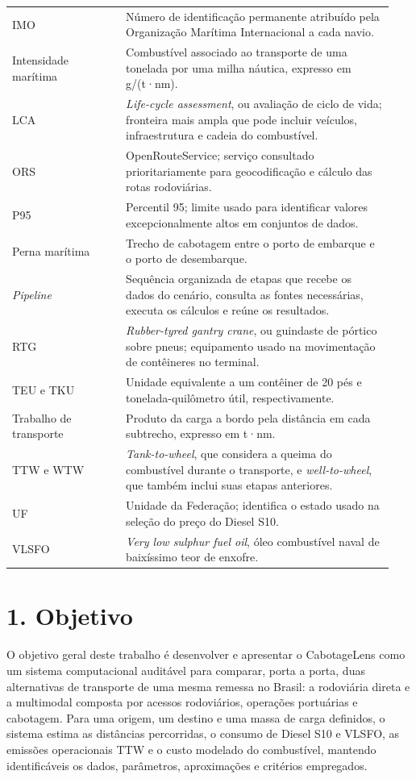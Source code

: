 \documentclass[brazil,]{article}
\let\oldsection\section
\renewcommand{\section}{\Needspace{14\baselineskip}\oldsection}
\begin{document}
\begin{longtable}{@{}p{0.28\linewidth}p{0.66\linewidth}@{}}
IMO & Número de identificação permanente atribuído pela Organização Marítima Internacional a cada navio. \\
Intensidade marítima & Combustível associado ao transporte de uma tonelada por uma milha náutica, expresso em g/(t·nm). \\
LCA & \textit{Life-cycle assessment}, ou avaliação de ciclo de vida; fronteira mais ampla que pode incluir veículos, infraestrutura e cadeia do combustível. \\
ORS & OpenRouteService; serviço consultado prioritariamente para geocodificação e cálculo das rotas rodoviárias. \\
P95 & Percentil 95; limite usado para identificar valores excepcionalmente altos em conjuntos de dados. \\
Perna marítima & Trecho de cabotagem entre o porto de embarque e o porto de desembarque. \\
\textit{Pipeline} & Sequência organizada de etapas que recebe os dados do cenário, consulta as fontes necessárias, executa os cálculos e reúne os resultados. \\
RTG & \textit{Rubber-tyred gantry crane}, ou guindaste de pórtico sobre pneus; equipamento usado na movimentação de contêineres no terminal. \\
TEU e TKU & Unidade equivalente a um contêiner de 20 pés e tonelada-quilômetro útil, respectivamente. \\
Trabalho de transporte & Produto da carga a bordo pela distância em cada subtrecho, expresso em t·nm. \\
TTW e WTW & \textit{Tank-to-wheel}, que considera a queima do combustível durante o transporte, e \textit{well-to-wheel}, que também inclui suas etapas anteriores. \\
UF & Unidade da Federação; identifica o estado usado na seleção do preço do Diesel S10. \\
VLSFO & \textit{Very low sulphur fuel oil}, óleo combustível naval de baixíssimo teor de enxofre. \\
\bottomrule
\end{longtable}

\clearpage

\hypertarget{objetivo}{%
\section{1. Objetivo}\label{objetivo}}

O objetivo geral deste trabalho é desenvolver e apresentar o
CabotageLens como um sistema computacional auditável para comparar, porta
a porta, duas alternativas de transporte de uma mesma remessa no Brasil:
a rodoviária direta e a multimodal composta por acessos rodoviários,
operações portuárias e cabotagem. Para uma origem, um destino e uma massa
de carga definidos, o sistema estima as distâncias percorridas, o consumo
de Diesel S10 e VLSFO, as emissões operacionais TTW e o custo modelado do
combustível, mantendo identificáveis os dados, parâmetros, aproximações e
critérios empregados.
\end{document}

